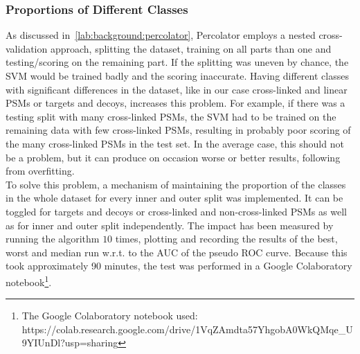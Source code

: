 \subsubsection{Proportions of Different Classes}
\label{lab:matmet:proportions}
As discussed in~\ref{lab:background:percolator}, Percolator employs a nested cross-validation approach, splitting the dataset, training on all parts than one and testing/scoring on the remaining part. If the splitting was uneven by chance, the SVM would be trained badly and the scoring inaccurate. Having different classes with significant differences in the dataset, like in our case cross-linked and linear PSMs or targets and decoys, increases this problem. For example, if there was a testing split with many cross-linked PSMs, the SVM had to be trained on the remaining data with few cross-linked PSMs, resulting in probably poor scoring of the many cross-linked PSMs in the test set. In the average case, this should not be a problem, but it can produce on occasion worse or better results, following from overfitting.\\
To solve this problem, a mechanism of maintaining the proportion of the classes in the whole dataset for every inner and outer split was implemented. It can be toggled for targets and decoys or cross-linked and non-cross-linked PSMs as well as for inner and outer split independently. The impact has been measured by running the algorithm $10$ times, plotting and recording the results of the best, worst and median run w.r.t. to the AUC of the pseudo ROC curve. Because this took approximately 90 minutes, the test was performed in a Google Colaboratory notebook\footnote{The Google Colaboratory notebook used:\\ https://colab.research.google.com/drive/1VqZAmdta57YhgobA0WkQMqe\_U9YIUnDl?usp=sharing}.
